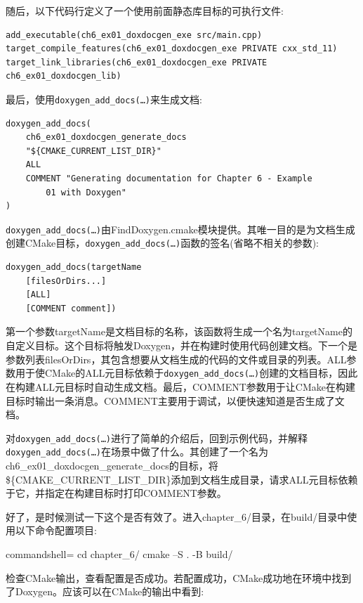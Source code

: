 随后，以下代码行定义了一个使用前面静态库目标的可执行文件:

\begin{lstlisting}[style=styleCMake]
add_executable(ch6_ex01_doxdocgen_exe src/main.cpp)
target_compile_features(ch6_ex01_doxdocgen_exe PRIVATE cxx_std_11)
target_link_libraries(ch6_ex01_doxdocgen_exe PRIVATE ch6_ex01_doxdocgen_lib)
\end{lstlisting}

最后，使用\texttt{doxygen\_add\_docs(…)}来生成文档:

\begin{lstlisting}[style=styleCMake]
doxygen_add_docs(
	ch6_ex01_doxdocgen_generate_docs
	"${CMAKE_CURRENT_LIST_DIR}"
	ALL
	COMMENT "Generating documentation for Chapter 6 - Example
		01 with Doxygen"
)
\end{lstlisting}
 
\texttt{doxygen\_add\_docs(…)}由FindDoxygen.cmake模块提供。其唯一目的是为文档生成创建CMake目标，\texttt{doxygen\_add\_docs(…)}函数的签名(省略不相关的参数):

\begin{lstlisting}[style=styleCMake]
doxygen_add_docs(targetName
	[filesOrDirs...]
	[ALL]
	[COMMENT comment])
\end{lstlisting}

第一个参数targetName是文档目标的名称，该函数将生成一个名为targetName的自定义目标。这个目标将触发Doxygen，并在构建时使用代码创建文档。下一个是参数列表filesOrDirs，其包含想要从文档生成的代码的文件或目录的列表。ALL参数用于使CMake的ALL元目标依赖于\texttt{doxygen\_add\_docs(…)}创建的文档目标，因此在构建ALL元目标时自动生成文档。最后，COMMENT参数用于让CMake在构建目标时输出一条消息。COMMENT主要用于调试，以便快速知道是否生成了文档。

对\texttt{doxygen\_add\_docs(…)}进行了简单的介绍后，回到示例代码，并解释\texttt{doxygen\_add\_docs(…)}在场景中做了什么。其创建了一个名为ch6\_ex01\_doxdocgen\_generate\_docs的目标，将\$\{CMAKE\_CURRENT\_LIST\_DIR\}添加到文档生成目录，请求ALL元目标依赖于它，并指定在构建目标时打印COMMENT参数。

好了，是时候测试一下这个是否有效了。进入chapter\_6/目录，在build/目录中使用以下命令配置项目:

\begin{tcblisting}{commandshell={}}
cd chapter_6/
cmake –S . -B build/
\end{tcblisting}

检查CMake输出，查看配置是否成功。若配置成功，CMake成功地在环境中找到了Doxygen。应该可以在CMake的输出中看到:

